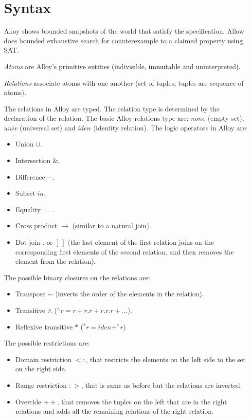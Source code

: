 \documentclass[12pt, a4paper]{report}
\newtheorem[style=M,bodystyle=\normalfont]{theorem}{Theorem}
\newtheorem[style=M,bodystyle=\normalfont]{corollary}{Corollary}
\newtheorem[style=M,bodystyle=\normalfont]{lemma}{Lemma}
\newtheorem[style=M,bodystyle=\normalfont]{definition}{Definition}
\begin{document}
\section{Syntax}
    Alloy shows bounded snapshots of the world that satisfy the specification. Allow does bounded exhaustive search for counterexample to a claimed property using SAT.
    \begin{definition}
        \emph{Atoms} are Alloy's primitive entities (indivisible, immutable and uninterpreted). 
    \end{definition}
    \begin{definition}
        \emph{Relations} associate atoms with one another (set of tuples; tuples are sequence of atoms).
    \end{definition}
    The relations in Alloy are typed. The relation type is determined by the declaration of the relation. The basic Alloy relations type are: $none$ (empty set), $univ$ (universal set) and $iden$ (identity relation). The logic operators in Alloy are: 
    \begin{itemize}
        \item Union $\cup$.
        \item Intersection $\&$.
        \item Difference $-$.
        \item Subset $in$.
        \item Equality $=$.
        \item Cross product $\rightarrow$ (similar to a natural join). 
        \item Dot join $.$ or $[\:]$ (the last element of the first relation joins on the corresponding first elements of the second relation, and then removes the element from the relation).
    \end{itemize}
    The possible binary closures on the relations are: 
    \begin{itemize}
        \item Transpose $\sim$ (inverts the order of the elements in the relation).
        \item Transitive $\land$ ($^{\land}r=r+r.r+r.r.r+\dots$). 
        \item Reflexive transitive $*$ ($^{*}r=iden+^{\land}r$)
    \end{itemize}
    The possible restrictions are: 
    \begin{itemize}
        \item Domain restriction $<:$, that restricts the elements on the left side to the set on the right side.
        \item Range restriction $:>$, that is same as before but the relations are inverted. 
        \item Override $++$, that removes the tuples on the left that are in the right relations and adds all the remaining relations of the right relation. 
    \end{itemize}
\end{document}
